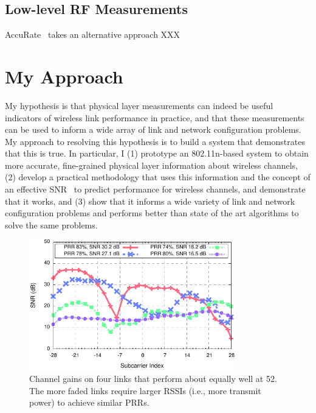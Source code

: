\subsection{Low-level RF Measurements}
AccuRate~\cite{Sen_AccuRate} takes an alternative approach XXX

\section{My Approach}
My hypothesis is that physical layer measurements can indeed be useful indicators of wireless link performance in practice, and that these measurements can be used to inform a wide array of link and network configuration problems. My approach to resolving this hypothesis is to build a system that demonstrates that this is true. In particular, I (1) prototype an 802.11n-based system to obtain more accurate, fine-grained physical layer information about wireless channels, (2) develop a practical methodology that uses this information and the concept of an effective SNR~\cite{Nanda_effectiveSNR} to predict performance for wireless channels, and demonstrate that it works, and (3) show that it informs a wide variety of link and network configuration problems and performs better than state of the art algorithms to solve the same problems.

\begin{figure}[t]
  \centering
  \includegraphics[width=0.8\textwidth]{figures/fsf_shape.pdf}
  \caption{Channel gains on four links that perform about equally well at 52\Mbps. The more faded links require larger RSSIs (i.e., more transmit power) to achieve similar PRRs.}
  \label{fig:example_fsf_shape}

\end{figure}

